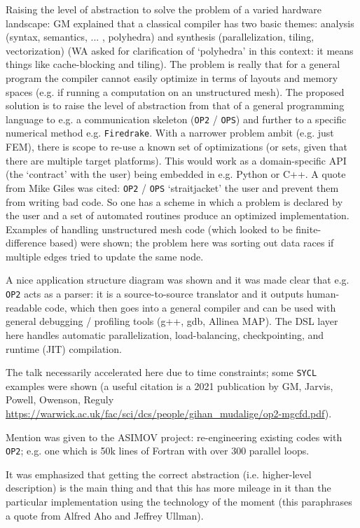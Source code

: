\documentclass[11pt]{article}
\begin{document}
Raising the level of abstraction to solve the problem of a varied hardware 
landscape: GM explained that a classical compiler has two basic themes: 
analysis (syntax, semantics, ... , polyhedra) and synthesis (parallelization, 
tiling, vectorization) (WA asked for clarification of `polyhedra' in this 
context: it means things like cache-blocking and tiling).  The problem is 
really that for a general program the compiler cannot easily optimize in terms 
of layouts and memory spaces (e.g. if running a computation on an unstructured 
mesh).  The proposed solution is to raise the level of abstraction from that of 
a general programming language to e.g. a communication skeleton ({\tt OP2} / 
{\tt OPS}) and further to a specific numerical method e.g. {\tt Firedrake}.  
With a narrower problem ambit (e.g. just FEM), there is scope to re-use a known 
set of optimizations (or sets, given that there are multiple target platforms). 
 This would work as a domain-specific API (the `contract' with the user) being 
embedded in e.g. Python or C++.  A quote from Mike Giles was cited: {\tt OP2} / 
{\tt OPS} `straitjacket' the user and prevent them from writing bad code.  So 
one has a scheme in which a problem is declared by the user and a set of 
automated routines produce an optimized implementation.  Examples of handling 
unstructured mesh code (which looked to be finite-difference based) were shown; 
the problem here was sorting out data races if multiple edges tried to update 
the same node.

A nice application structure diagram was shown and it was made clear that e.g. 
{\tt OP2} acts as a parser: it is a source-to-source translator and it outputs 
human-readable code, which then goes into a general compiler and can be used 
with general debugging / profiling tools (g++, gdb, Allinea MAP).  The DSL 
layer here handles automatic parallelization, load-balancing, checkpointing, 
and runtime (JIT) compilation.

The talk necessarily accelerated here due to time constraints; some {\tt SYCL} 
examples were shown (a useful citation is a 2021 publication by GM, Jarvis, 
Powell, Owenson, Reguly
\url{https://warwick.ac.uk/fac/sci/dcs/people/gihan_mudalige/op2-mgcfd.pdf}).

Mention was given to the ASIMOV project: re-engineering existing codes with 
{\tt OP2}; e.g. one which is 50k lines of Fortran with over 300 parallel loops.

It was emphasized that getting the correct abstraction (i.e. higher-level 
description) is the main thing and that this has more mileage in it than the 
particular implementation using the technology of the moment (this paraphrases 
a quote from Alfred Aho and Jeffrey Ullman).
\end{document}
